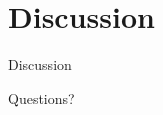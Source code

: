 
\section{Discussion}
\begin{frame}[plain] %
	\begin{center}
		{\Huge Discussion}

		\bigskip\bigskip %

		{\LARGE Questions?}
	\end{center}
\end{frame}


